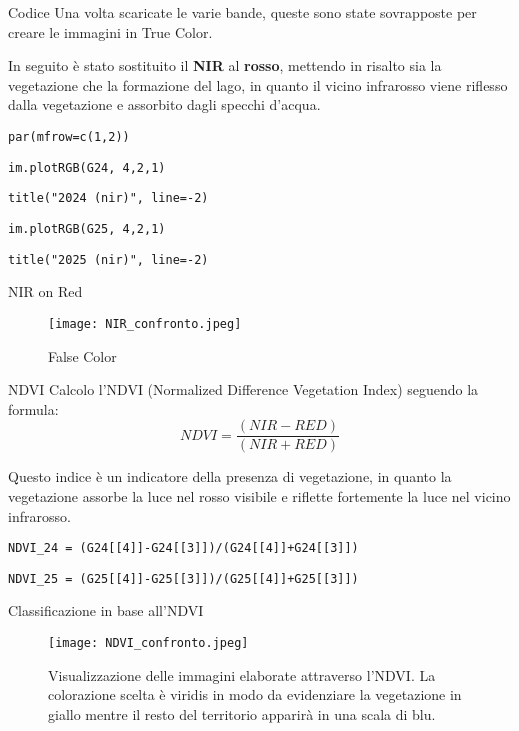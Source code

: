 \documentclass{beamer} %
\begin{document}
\begin{frame}{Codice}
    Una volta scaricate le varie bande, queste sono state sovrapposte per creare le immagini in True Color.

    \bigskip In seguito è stato sostituito il \textbf{NIR} al \textbf{rosso}, mettendo in risalto sia la vegetazione che la formazione del lago, in quanto il vicino infrarosso viene riflesso dalla vegetazione e assorbito dagli specchi d'acqua.

    \bigskip \texttt{par(mfrow=c(1,2))}
    
    \texttt{im.plotRGB(G24, 4,2,1)}
    
    \texttt{title("2024 (nir)", line=-2)}
    
    \texttt{im.plotRGB(G25, 4,2,1)}
    
    \texttt{title("2025 (nir)", line=-2)}
\end{frame}

\begin{frame}{NIR on Red}
    \begin{figure}
            \centering
            \texttt{[image: NIR\_confronto.jpeg]}
            \caption{False Color}
            \label{fig:placeholder}
        
    \end{figure}
\end{frame}

\begin{frame}{NDVI}
    Calcolo l'NDVI (Normalized Difference Vegetation Index) seguendo la formula:
    \begin{equation}
                NDVI = \frac{(NIR - RED)}{(NIR + RED)}
    \end{equation}

    \bigskip Questo indice è un indicatore della presenza di vegetazione, in quanto la vegetazione assorbe la luce nel rosso visibile e riflette fortemente la luce nel vicino infrarosso.

    \begin{center}
        \bigskip \texttt{NDVI\_24 = (G24[[4]]-G24[[3]])/(G24[[4]]+G24[[3]])}
        
        \bigskip \texttt{NDVI\_25 = (G25[[4]]-G25[[3]])/(G25[[4]]+G25[[3]])} 
    \end{center}
\end{frame}

\begin{frame}{Classificazione in base all'NDVI}
    \begin{figure}
        \centering
        \texttt{[image: NDVI\_confronto.jpeg]}
        \caption{Visualizzazione delle immagini elaborate attraverso l'NDVI. La colorazione scelta è viridis in modo da evidenziare la vegetazione in giallo mentre il resto del territorio apparirà in una scala di blu.}
        \label{fig:placeholder}
    \end{figure}
\end{frame}
\end{document}
